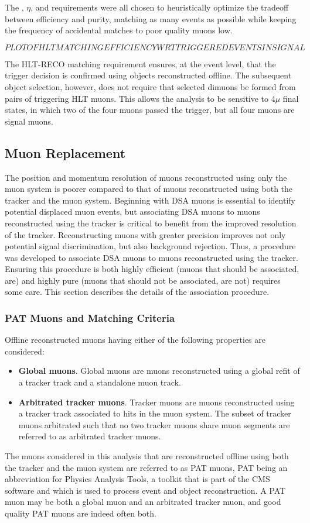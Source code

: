 The \pT, $\eta$, and \deltaR requirements were all chosen to heuristically optimize the tradeoff between efficiency and purity, matching as many events as possible while keeping the frequency of accidental matches to poor quality muons low.

$$PLOT OF HLT MATCHING EFFICIENCY WRT TRIGGERED EVENTS IN SIGNAL$$

The HLT-RECO matching requirement ensures, at the event level, that the trigger decision is confirmed using objects reconstructed offline.
The subsequent object selection, however, does not require that selected dimuons be formed from pairs of triggering HLT muons.
This allows the analysis to be sensitive to 4$\mu$ final states, in which two of the four muons passed the trigger, but all four muons are signal muons.

\subsection{\DSAToPAT Muon Replacement}
The position and momentum resolution of muons reconstructed using only the muon system is poorer compared to that of muons reconstructed using both the tracker and the muon system.
Beginning with DSA muons is essential to identify potential displaced muon events, but associating DSA muons to muons reconstructed using the tracker is critical to benefit from the improved resolution of the tracker.
Reconstructing muons with greater precision improves not only potential signal discrimination, but also background rejection.
Thus, a procedure was developed to associate DSA muons to muons reconstructed using the tracker.
Ensuring this procedure is both highly efficient (\ie muons that should be associated, are) and highly pure (\ie muons that should not be associated, are not) requires some care.
This section describes the details of the association procedure.

\subsubsection{PAT Muons and Matching Criteria}
Offline reconstructed muons having either of the following properties are considered:
\begin{itemize}
  \item \textbf{Global muons}. Global muons are muons reconstructed using a global refit of a tracker track and a standalone muon track.
  \item \textbf{Arbitrated tracker muons}. Tracker muons are muons reconstructed using a tracker track associated to hits in the muon system. The subset of tracker muons arbitrated such that no two tracker muons share muon segments are referred to as arbitrated tracker muons.
\end{itemize}
The muons considered in this analysis that are reconstructed offline using both the tracker and the muon system are referred to as PAT muons, PAT being an abbreviation for Physics Analysis Tools, a toolkit that is part of the CMS software and which is used to process event and object reconstruction.
A PAT muon may be both a global muon and an arbitrated tracker muon, and good quality PAT muons are indeed often both.

